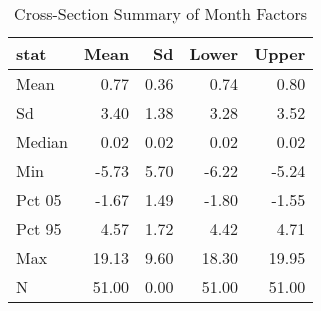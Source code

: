 \begin{table}

\caption{Cross-Section Summary of Month Factors}
\centering
\begin{tabular}[t]{lrrrr}
\toprule
stat & Mean & Sd & Lower & Upper\\
\midrule
Mean & 0.77 & 0.36 & 0.74 & 0.80\\
Sd & 3.40 & 1.38 & 3.28 & 3.52\\
Median & 0.02 & 0.02 & 0.02 & 0.02\\
Min & -5.73 & 5.70 & -6.22 & -5.24\\
Pct 05 & -1.67 & 1.49 & -1.80 & -1.55\\
\addlinespace
Pct 95 & 4.57 & 1.72 & 4.42 & 4.71\\
Max & 19.13 & 9.60 & 18.30 & 19.95\\
N & 51.00 & 0.00 & 51.00 & 51.00\\
\bottomrule
\end{tabular}
\end{table}

